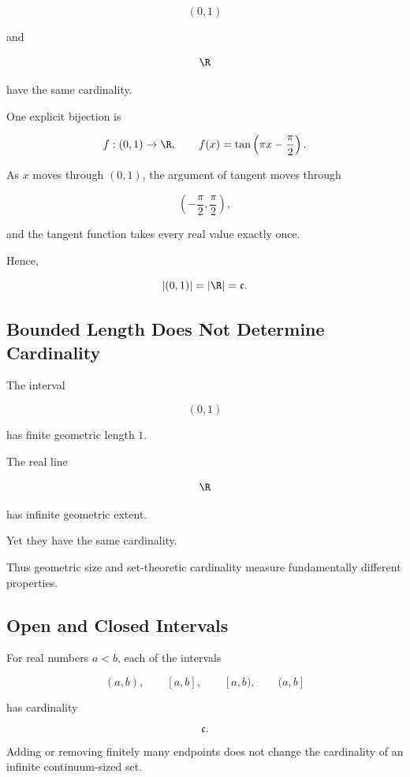 \[ (0,1) \]

and

\[ \R \]

have the same cardinality.

One explicit bijection is

\[ f:(0,1)\to\R,\qquad
f(x)=\tan\left(\pi x-\frac{\pi}{2}\right). \]

As \(x\) moves through \((0,1)\), the argument of tangent moves through

\[ \left(-\frac{\pi}{2},\frac{\pi}{2}\right), \]

and the tangent function takes every real value exactly once.

Hence,

\[ |(0,1)|=|\R|=\mathfrak c. \]

\subsection{Bounded Length Does Not Determine Cardinality}
\label{subsec:length-not-cardinality}

The interval

\[ (0,1) \]

has finite geometric length \(1\).

The real line

\[ \R \]

has infinite geometric extent.

Yet they have the same cardinality.

Thus geometric size and set-theoretic cardinality measure fundamentally
different properties.

\subsection{Open and Closed Intervals}
\label{subsec:open-closed-same-cardinality}

For real numbers \(a<b\), each of the intervals

\[ (a,b),\qquad [a,b],\qquad [a,b),\qquad (a,b] \]

has cardinality

\[ \mathfrak c. \]

Adding or removing finitely many endpoints does not change the cardinality of
an infinite continuum-sized set.

